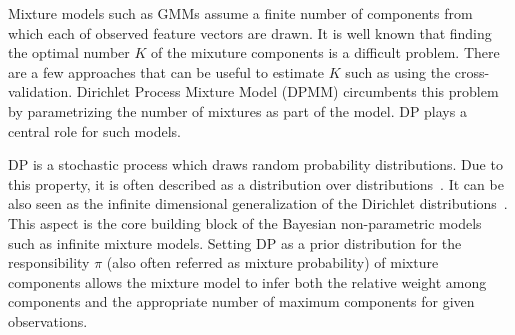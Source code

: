 \documentclass{article}
\begin{document}
Mixture models such as GMMs assume a finite number of components from which each of observed feature vectors are drawn. It is well known that finding the optimal number $K$ of the mixuture components is a difficult problem. There are a few approaches that can be useful to estimate $K$ such as using the cross-validation. Dirichlet Process Mixture Model (DPMM) circumbents this problem by parametrizing the number of mixtures as part of the model. DP plays a central role for such models.

DP is a stochastic process which draws random probability distributions. Due to this property, it is often described as a distribution over distributions~\cite{DBLP:reference/ml/Teh17}. It can be also seen as the infinite dimensional generalization of the Dirichlet distributions~\cite{DBLP:reference/ml/Teh17}.
This aspect is the core building block of the Bayesian non-parametric models such as infinite mixture models. Setting DP as a prior distribution for the responsibility $\pi$ (also often referred as mixture probability) of mixture components allows the mixture model to infer both the relative weight among components and the appropriate number of maximum components for given observations.
\end{document}
